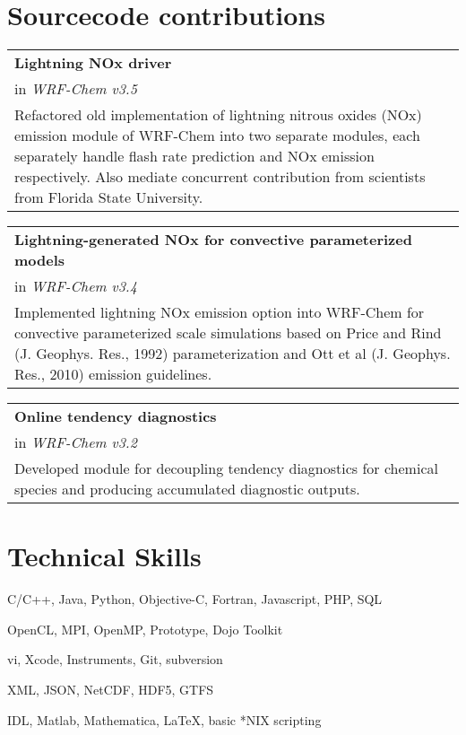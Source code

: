 \documentclass[overlap,12pt,centered]{res}
\makeatletter
\newcommand{\block}{\begin{tabular}{@{}p{6.5in}}}
\makeatother
\begin{document}
\begin{resume}
		\section{\sc Sourcecode contributions}
		
		\block
		{\bf Lightning NOx driver} \\
		in {\it WRF-Chem v3.5} \\
		Refactored old implementation of lightning nitrous oxides (NOx) emission module of WRF-Chem into two separate modules, each separately handle flash rate prediction and NOx emission respectively. Also mediate concurrent contribution from scientists from Florida State University.
		\end{tabular}
		
		\block
		{\bf Lightning-generated NOx for convective parameterized models} \\
		in {\it WRF-Chem v3.4} \\
		Implemented lightning NOx emission option into WRF-Chem for convective parameterized scale simulations based on Price and Rind (J. Geophys. Res., 1992) parameterization and Ott et al (J. Geophys. Res., 2010) emission guidelines.
		\end{tabular}
		
		\block
		{\bf Online tendency diagnostics} \\
		in {\it WRF-Chem v3.2} \\
		Developed module for decoupling tendency diagnostics for chemical species and producing accumulated diagnostic outputs.
		\end{tabular}
		
		\section{\sc Technical Skills}\vspace{.15in}
		\begin{description}
		\setlength{\itemsep}{-.02in}
			\item[Languages:] C/C++, Java, Python, Objective-C, Fortran, Javascript, PHP, SQL
			\item[Frameworks and libraries:]  OpenCL, MPI, OpenMP, Prototype, Dojo Toolkit
			\item[IDEs and tools:] vi, Xcode, Instruments, Git, subversion
			\item[Data formats:] XML, JSON, NetCDF, HDF5, GTFS
			\item[Other tools:] IDL, Matlab, Mathematica, \LaTeX, basic *NIX scripting
		\end{description}\shrink
		

\end{resume}
\end{document}
